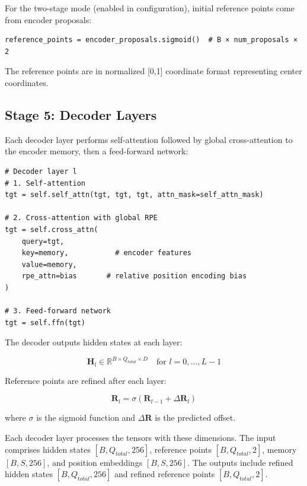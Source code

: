 \documentclass[12pt,a4paper]{article}
\newcommand{\B}[1]{\mathbf{#1}}
\begin{document}
For the two-stage mode (enabled in configuration), initial reference points come from encoder proposals:

\begin{verbatim}
reference_points = encoder_proposals.sigmoid()  # B × num_proposals × 2
\end{verbatim}

The reference points are in normalized [0,1] coordinate format representing center coordinates.

\subsection{Stage 5: Decoder Layers}

Each decoder layer performs self-attention followed by global cross-attention to the encoder memory, then a feed-forward network:

\begin{verbatim}
# Decoder layer l
# 1. Self-attention
tgt = self.self_attn(tgt, tgt, tgt, attn_mask=self_attn_mask)

# 2. Cross-attention with global RPE
tgt = self.cross_attn(
    query=tgt, 
    key=memory,           # encoder features
    value=memory,
    rpe_attn=bias       # relative position encoding bias
)

# 3. Feed-forward network
tgt = self.ffn(tgt)
\end{verbatim}

The decoder outputs hidden states at each layer:

\begin{equation}
\B{H}_{l} \in \mathbb{R}^{B \times Q_{total} \times D} \quad \text{for } l = 0, \ldots, L-1
\end{equation}

Reference points are refined after each layer:

\begin{equation}
\B{R}_{l} = \sigma(\B{R}_{l-1} + \Delta\B{R}_{l})
\end{equation}

where $\sigma$ is the sigmoid function and $\Delta\B{R}$ is the predicted offset.

Each decoder layer processes the tensors with these dimensions. The input comprises hidden states $[B, Q_{total}, 256]$, reference points $[B, Q_{total}, 2]$, memory $[B, S, 256]$, and position embeddings $[B, S, 256]$. The outputs include refined hidden states $[B, Q_{total}, 256]$ and refined reference points $[B, Q_{total}, 2]$.
\end{document}
